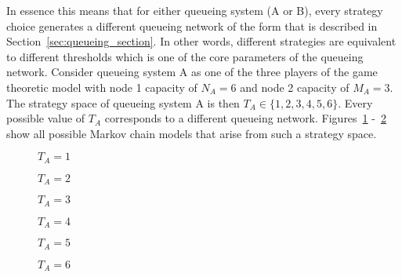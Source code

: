 In essence this means that for either queueing system  (A or B), every strategy
choice generates a different queueing network of the form that is described in
Section~\ref{sec:queueing_section}.
In other words, different strategies are equivalent to different thresholds
which is one of the core parameters of the queueing network.
Consider queueing system A as one of the three players of the game theoretic
model with node 1 capacity of \(N_A = 6\) and node 2 capacity of \(M_A = 3\).
The strategy space of queueing system A is then
\(T_A \in \{1, 2, 3, 4, 5, 6\}\).
Every possible value of \(T_A\) corresponds to a different queueing network.
Figures~\ref{fig:game_strategy_visualisation_N_6_M_3_first}
-~\ref{fig:game_strategy_visualisation_N_6_M_3_last} show all possible Markov chain
models that arise from such a strategy space.

\begin{figure}[H]
    \centering
    \scalebox{0.8}{
        
    }
    \caption{\(T_A = 1\)}
    \label{fig:game_strategy_visualisation_N_6_M_3_first}
\end{figure}

\begin{figure}[H]
    \centering
    \scalebox{0.8}{
        
    }
    \caption{\(T_A = 2\)}
\end{figure}

\begin{figure}[H]
    \centering
    \scalebox{0.8}{
        
    }
    \caption{\(T_A = 3\)}
\end{figure}


\begin{figure}[H]
    \centering
    \scalebox{0.8}{
        
    }
    \caption{\(T_A = 4\)}
\end{figure}

\begin{figure}[H]
    \centering
    \scalebox{0.8}{
        
    }
    \caption{\(T_A = 5\)}
\end{figure}

\begin{figure}[H]
    \centering
    \scalebox{0.8}{
        
    }
    \caption{\(T_A = 6\)}
    \label{fig:game_strategy_visualisation_N_6_M_3_last}
\end{figure}

